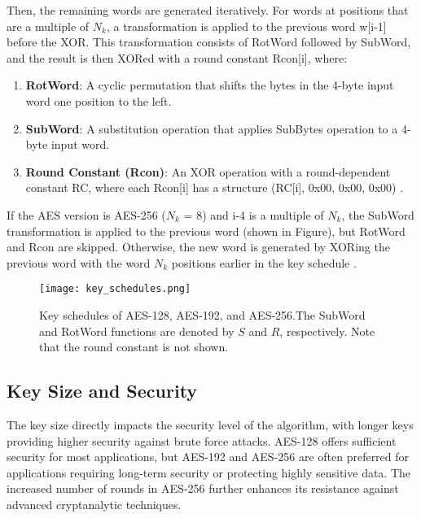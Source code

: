 Then, the remaining words are generated iteratively. For words at positions that are a multiple of $N_k$, a 
transformation is applied to the previous word w[i-1] before the XOR. This transformation consists of RotWord 
followed by SubWord, and the result is then XORed with a round constant Rcon[i], where:

\begin{enumerate}
    \item \textbf{RotWord}: A cyclic permutation that shifts the bytes in the 4-byte input word one position to the left. 
    \item \textbf{SubWord}: A substitution operation that applies SubBytes operation to a 4-byte input word. 
    \item \textbf{Round Constant (Rcon)}:  An XOR operation with a round-dependent constant RC, where each Rcon[i]
    has a structure (RC[i], 0x00, 0x00, 0x00) \cite{Standards2001}. 
\end{enumerate}

If the AES version is AES-256 ($N_k$ = 8) and i-4 is a multiple of $N_k$, the SubWord transformation is applied to the 
previous word (shown in Figure), but RotWord and Rcon are skipped. Otherwise, the new word is generated by XORing the previous word 
with the word $N_k$ positions earlier in the key schedule \cite{Standards2001}. 

\begin{figure}[h] %
    \centering
    \texttt{[image: key\_schedules.png]} %
    \caption{
        Key schedules of AES-128, AES-192, and AES-256.The SubWord and
        RotWord functions are denoted by $S$ and $R$, respectively. Note that the round
        constant is not shown. \cite{Key_Collisions}
    }
    \label{fig:key_comb} %
\end{figure}

\subsection{Key Size and Security}

The key size directly impacts the security level of the algorithm, with 
longer keys providing higher security against brute force attacks. AES-128 offers sufficient security 
for most applications, but AES-192 and AES-256 are often preferred for applications requiring 
long-term security or protecting highly sensitive data. The increased number of rounds in AES-256 
further enhances its resistance against advanced cryptanalytic techniques.

